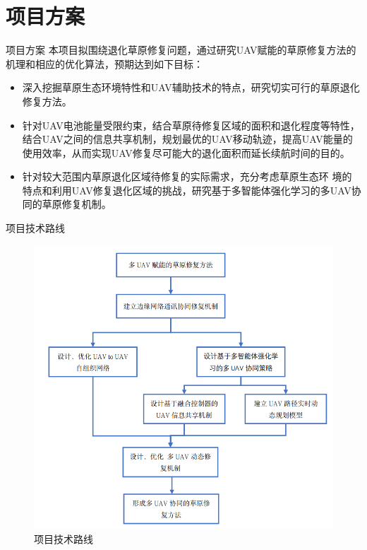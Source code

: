 \documentclass{beamer}
\begin{document}
\section{项目方案}

\begin{frame}{项目方案}
    本项目拟围绕退化草原修复问题，通过研究UAV赋能的草原修复方法的机理和相应的优化算法，预期达到如下目标：
    \begin{itemize}
        \item 深入挖掘草原生态环境特性和UAV辅助技术的特点，研究切实可行的草原退化修复方法。
        \item 针对UAV电池能量受限约束，结合草原待修复区域的面积和退化程度等特性，结合UAV之间的信息共享机制，规划最优的UAV移动轨迹，提高UAV能量的使用效率，从而实现UAV修复尽可能大的退化面积而延长续航时间的目的。
        \item 针对较大范围内草原退化区域待修复的实际需求，充分考虑草原生态环 境的特点和利用UAV修复退化区域的挑战，研究基于多智能体强化学习的多UAV协同的草原修复机制。
    \end{itemize}
\end{frame}

\begin{frame}{项目技术路线}
    \begin{figure}[htbp]
        \centering
        \includegraphics[scale=0.3]{pic/4.png}
        \caption{项目技术路线}
    \end{figure}
\end{frame}
\end{document}
